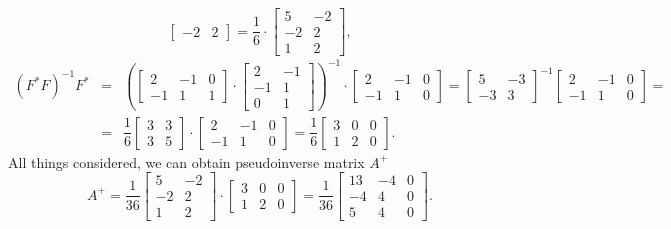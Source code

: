 \begin{solution}
\[\begin{bmatrix}
            -2 & 2
        \end{bmatrix} = \dfrac{1}{6}\cdot\begin{bmatrix}
            5 & -2 \\
            -2 & 2\\
            1 & 2
        \end{bmatrix},  
    \]
    \begin{eqnarray*}
        (F^* F)^{-1}  F^* &=& \left(\begin{bmatrix}
            2 & -1 & 0\\
            -1 & 1 & 1
        \end{bmatrix} \cdot \begin{bmatrix}
            2 & -1 \\ -1 & 1 \\
            0 & 1
        \end{bmatrix}\right)^{-1}\cdot \begin{bmatrix}
            2 & -1 & 0\\
            -1 & 1 & 0
        \end{bmatrix} = \begin{bmatrix}
            5 & -3 \\
            -3 & 3
        \end{bmatrix}^{-1} \begin{bmatrix}
            2 & -1 & 0\\
            -1 & 1 & 0
        \end{bmatrix} = \\ &=& \dfrac{1}{6} \begin{bmatrix}
            3 & 3 \\
            3 & 5
        \end{bmatrix} \cdot \begin{bmatrix}
            2 & -1 & 0\\
            -1 & 1 & 0
        \end{bmatrix} = \dfrac{1}{6} \begin{bmatrix}
            3 & 0 & 0\\
            1 & 2 & 0
        \end{bmatrix}.
    \end{eqnarray*}
    All things considered, we can obtain pseudoinverse matrix $A^+$
    \[
        A^+=\dfrac{1}{36} \begin{bmatrix}
            5 & -2 \\
            -2 & 2\\
            1 & 2
        \end{bmatrix} \cdot \begin{bmatrix}
            3 & 0 & 0\\
            1 & 2 & 0
        \end{bmatrix} = \dfrac{1}{36} \begin{bmatrix}
            13 & -4 & 0\\
            -4 & 4 & 0\\
            5 & 4 & 0
        \end{bmatrix}.
    \]
\end{solution}
